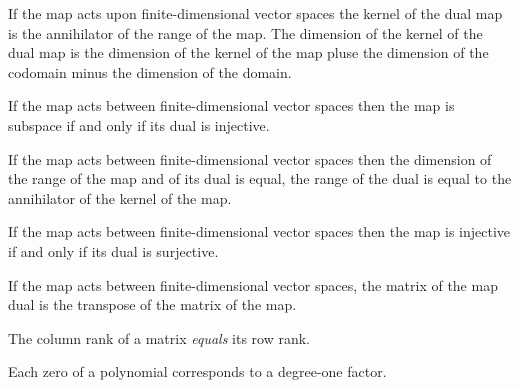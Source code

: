 \begin{multicols}{3}
  If the map acts upon finite-dimensional vector spaces
  the kernel of the dual map is the annihilator of the range of the map.
  The dimension of the kernel of the dual map is the dimension of the kernel
  of the map pluse the dimension of the codomain minus the dimension of the domain.
  
  If the map acts between finite-dimensional vector spaces then the map is subspace if and only if its dual is injective.

  If the map acts between finite-dimensional vector spaces then the dimension of the range of the map and of its dual is equal,
  the range of the dual is equal to the annihilator of the kernel of the map.

  If the map acts between finite-dimensional vector spaces then the map is injective if and only if its dual is surjective.

  If the map acts between finite-dimensional vector spaces, the matrix of the map dual is the transpose of the matrix of the map.
  
  The column rank of a matrix \textit{equals} its row rank.

  Each zero of a polynomial corresponds to a degree-one factor.
  
  
  
\end{multicols}


